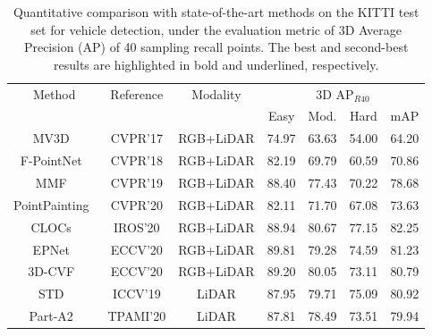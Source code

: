 \documentclass[twocolumn]{svjour3}
\begin{document}
\setlength{\tabcolsep}{15pt}
\begin{table*}[t]
\centering
\caption{Quantitative comparison with state-of-the-art methods on the KITTI test set for vehicle detection, under the evaluation metric of 3D Average Precision (AP) of 40 sampling recall points. The best and second-best results are highlighted in bold and underlined, respectively.}
\label{table:kitti_test}
\begin{tabular}{c|c|c|cccc} 
\toprule
\multirow{2}{*}{Method} & \multirow{2}{*}{Reference} & \multirow{2}{*}{Modality} & \multicolumn{4}{c}{ 3D $\mathrm{AP}_{R40}$  }      \\
&                            &                           & Easy  & Mod. & Hard  & mAP    \\ 
\hline
MV3D~\citep{chen2017multi}		               & CVPR'17                   & RGB+LiDAR                 & 74.97          & 63.63          & 54.00             & 64.20           \\
F-PointNet~\citep{qi2018frustum}                 & CVPR'18                   & RGB+LiDAR                 & 82.19          & 69.79          & 60.59          & 70.86           \\
MMF~\citep{liang2019multi}                     & CVPR'19                   & RGB+LiDAR                 & 88.40           & 77.43          & 70.22          & 78.68           \\
PointPainting~\citep{vora2020pointpainting}  & CVPR'20                  & RGB+LiDAR                 & 82.11          & 71.70           & 67.08          & 73.63           \\
CLOCs~\citep{pang2020clocs}                      & IROS'20                  & RGB+LiDAR                 & 88.94          & 80.67          & 77.15          & 82.25           \\
EPNet~\citep{huang2020epnet}    & ECCV'20                   & RGB+LiDAR                 & 89.81          & 79.28          & 74.59          & 81.23           \\
3D-CVF~\citep{yoo20203d}   & ECCV'20                   & RGB+LiDAR                 & 89.20           & 80.05          & 73.11          & 80.79           \\ 
\hline
STD~\citep{yang2019std}                     & ICCV'19                  & LiDAR                     & 87.95 & 79.71    & 75.09 & 80.92  \\
Part-A2~\citep{shi2020points}                 & TPAMI'20                 & LiDAR                     & 87.81 & 78.49    & 73.51 & 79.94  \\

\end{tabular}
\end{table*}
\end{document}
